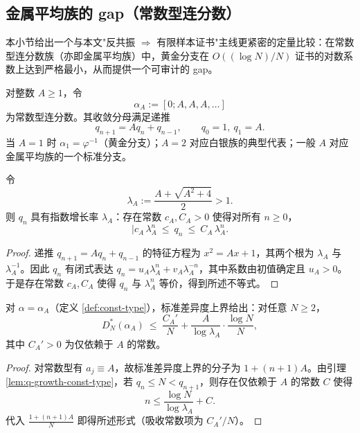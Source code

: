 \subsection{金属平均族的 gap（常数型连分数）}\label{app:kronecker-discrepancy-metallic-gap}

本小节给出一个与本文"反共振 $\Rightarrow$ 有限样本证书"主线更紧密的定量比较：在常数型连分数族（亦即金属平均族）中，黄金分支在 $O((\log N)/N)$ 证书的对数系数上达到严格最小，从而提供一个可审计的 gap。

\begin{definition}[常数型与金属平均族]\label{def:const-type}
对整数 $A\ge 1$，令
\[
\alpha_A:=[0;A,A,A,\dots]
\]
为常数型连分数。其收敛分母满足递推
\[
q_{n+1}=Aq_n+q_{n-1},\qquad q_0=1,\ q_1=A.
\]
当 $A=1$ 时 $\alpha_1=\varphi^{-1}$（黄金分支）；$A=2$ 对应白银族的典型代表；一般 $A$ 对应金属平均族的一个标准分支。
\end{definition}

\begin{lemma}[指数增长率]\label{lem:q-growth-const-type}
令
\[
\lambda_A:=\frac{A+\sqrt{A^2+4}}{2}>1.
\]
则 $q_n$ 具有指数增长率 $\lambda_A$：存在常数 $c_A,C_A>0$ 使得对所有 $n\ge 0$，
\[
|c_A\,\lambda_A^n\ \le\ q_n\ \le\ C_A\,\lambda_A^n.
\]
\end{lemma}

\begin{proof}
递推 $q_{n+1}=Aq_n+q_{n-1}$ 的特征方程为 $x^2=Ax+1$，其两个根为 $\lambda_A$ 与 $\lambda_A^{-1}$。因此 $q_n$ 有闭式表达 $q_n=u_A\lambda_A^n+v_A\lambda_A^{-n}$，其中系数由初值确定且 $u_A>0$。于是存在常数 $c_A,C_A$ 使得 $q_n$ 与 $\lambda_A^n$ 等价，得到所述不等式。
\end{proof}

\begin{proposition}\label{prop:const-type-envelope}
对 $\alpha=\alpha_A$（定义 \ref{def:const-type}），标准差异度上界给出：对任意 $N\ge 2$，
\[
D_N^*(\alpha_A)\ \le\ \frac{C_A'}{N}+\frac{A}{\log\lambda_A}\cdot\frac{\log N}{N},
\]
其中 $C_A'>0$ 为仅依赖于 $A$ 的常数。
\end{proposition}

\begin{proof}
对常数型有 $a_j\equiv A$，故标准差异度上界的分子为 $1+(n+1)A$。由引理 \ref{lem:q-growth-const-type}，若 $q_n\le N<q_{n+1}$，则存在仅依赖于 $A$ 的常数 $C$ 使得
\[
n\le \frac{\log N}{\log \lambda_A}+C.
\]
代入 $\frac{1+(n+1)A}{N}$ 即得所述形式（吸收常数项为 $C_A'/N$）。
\end{proof}

